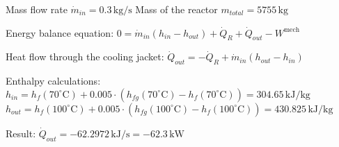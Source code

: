 Mass flow rate \( \dot{m}_{in} = 0.3 \, \text{kg/s} \)  
Mass of the reactor \( m_{total} = 5755 \, \text{kg} \)  

Energy balance equation:  
\( 0 = \dot{m}_{in} (h_{in} - h_{out}) + \dot{Q}_R + \dot{Q}_{out} - W^{\text{mech}} \)  

Heat flow through the cooling jacket:  
\( \dot{Q}_{out} = -\dot{Q}_R + \dot{m}_{in} (h_{out} - h_{in}) \)  

Enthalpy calculations:  
\( h_{in} = h_f(70^\circ \text{C}) + 0.005 \cdot (h_{fg}(70^\circ \text{C}) - h_f(70^\circ \text{C})) = 304.65 \, \text{kJ/kg} \)  
\( h_{out} = h_f(100^\circ \text{C}) + 0.005 \cdot (h_{fg}(100^\circ \text{C}) - h_f(100^\circ \text{C})) = 430.825 \, \text{kJ/kg} \)  

Result:  
\( \dot{Q}_{out} = -62.2972 \, \text{kJ/s} = -62.3 \, \text{kW} \)